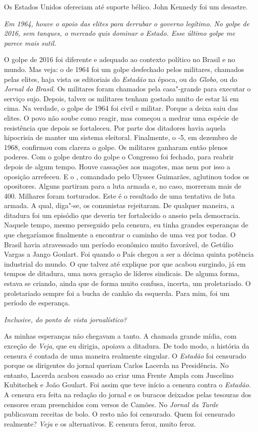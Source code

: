 \normalfont 
Os Estados Unidos ofereciam até suporte bélico. John
Kennedy foi um desastre.

\itshape
 Em 1964, houve o apoio das elites para derrubar o
governo legítimo. No golpe de 2016, sem tanques, o mercado quis dominar
o Estado. Esse último golpe me parece mais sutil.

\normalfont 
O golpe de 2016 foi diferente e adequado ao contexto
político no Brasil e no mundo. Mas veja: o de 1964 foi um golpe
desfechado pelos militares, chamados pelas elites, haja vista os
editoriais do \emph{Estadão} na época, ou do \emph{Globo}, ou do
\emph{Jornal do} \emph{Brasil}. Os militares foram chamados pela
casa"-grande para executar o serviço sujo. Depois, talvez os militares
tenham gostado muito de estar lá em cima. Na verdade, o golpe de 1964
foi civil e militar. Porque a deixa saiu das elites. O povo não soube
como reagir, mas começou a medrar uma espécie de resistência que depois
se fortaleceu. Por parte dos ditadores havia aquela hipocrisia de manter
um sistema eleitoral. Finalmente, o -5, em dezembro de 1968, confirmou
com clareza o golpe. Os militares ganharam então plenos poderes. Com o
golpe dentro do golpe o Congresso foi fechado, para reabrir depois de
algum tempo. Houve cassações aos magotes, mas nem por isso a oposição
arrefeceu. E o , comandado pelo Ulysses Guimarães, aglutinou todos os
opositores. Alguns partiram para a luta armada e, no caso, morreram mais
de 400. Milhares foram torturados. Este é o resultado de uma tentativa
de luta armada. A qual, diga"-se, os comunistas rejeitaram. De qualquer
maneira, a ditadura foi um episódio que deveria ter fortalecido o anseio
pela democracia. Naquele tempo, mesmo perseguido pela censura, eu tinha
grandes esperanças de que chegaríamos finalmente a encontrar o caminho
de uma vez por todas. O Brasil havia atravessado um período econômico
muito favorável, de Getúlio Vargas a Jango Goulart. Foi quando o País
chegou a ser a décima quinta potência industrial do mundo. O que talvez
até explique por que acabou surgindo, já em tempos de ditadura, uma nova
geração de líderes sindicais. De alguma forma, estava se criando, ainda
que de forma muito confusa, incerta, um proletariado. O proletariado
sempre foi a bucha de canhão da esquerda. Para mim, foi um período de
esperança.

\itshape
 Inclusive, do ponto de vista jornalístico?

\normalfont 
As minhas esperanças não chegavam a tanto. A chamada
grande mídia, com exceção de \emph{Veja}, que eu dirigia, apoiava a
ditadura. De todo modo, a história da censura é contada de uma maneira
realmente singular. O \emph{Estadão} foi censurado porque os dirigentes
do jornal queriam Carlos Lacerda na Presidência. No entanto, Lacerda
acabou cassado ao criar uma Frente Ampla com Juscelino Kubitschek e João
Goulart. Foi assim que teve início a censura contra o \emph{Estadão}. A
censura era feita na redação do jornal e os buracos deixados pelas
tesouras dos censores eram preenchidos com versos de Camões. No
\emph{Jornal da Tarde} publicavam receitas de bolo. O resto não foi
censurado. Quem foi censurado realmente? \emph{Veja} e os alternativos.
E censura feroz, muito feroz.

